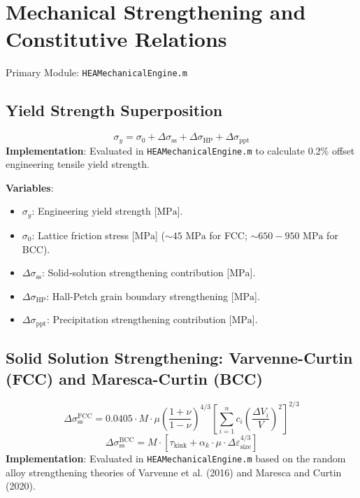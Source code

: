 \documentclass[11pt,a4paper]{article}
\begin{document}
\section{Mechanical Strengthening and Constitutive Relations}
Primary Module: \texttt{HEAMechanicalEngine.m}

\subsection{Yield Strength Superposition}
\begin{equation}
\sigma_y = \sigma_0 + \Delta\sigma_{\text{ss}} + \Delta\sigma_{\text{HP}} + \Delta\sigma_{\text{ppt}}
\end{equation}
\textbf{Implementation}: Evaluated in \texttt{HEAMechanicalEngine.m} to calculate 0.2\% offset engineering tensile yield strength.

\noindent\textbf{Variables}:
\begin{itemize}
  \item $\sigma_y$: Engineering yield strength [$\text{MPa}$].
  \item $\sigma_0$: Lattice friction stress [$\text{MPa}$] ($\sim 45\text{ MPa}$ for FCC; $\sim 650 - 950\text{ MPa}$ for BCC).
  \item $\Delta\sigma_{\text{ss}}$: Solid-solution strengthening contribution [$\text{MPa}$].
  \item $\Delta\sigma_{\text{HP}}$: Hall-Petch grain boundary strengthening [$\text{MPa}$].
  \item $\Delta\sigma_{\text{ppt}}$: Precipitation strengthening contribution [$\text{MPa}$].
\end{itemize}

\subsection{Solid Solution Strengthening: Varvenne-Curtin (FCC) and Maresca-Curtin (BCC)}
\begin{equation}
\Delta\sigma_{\text{ss}}^{\text{FCC}} = 0.0405 \cdot M \cdot \mu \left(\frac{1 + \nu}{1 - \nu}\right)^{4/3} \left[ \sum_{i=1}^n c_i \left(\frac{\Delta V_i}{V}\right)^2 \right]^{2/3}
\end{equation}
\begin{equation}
\Delta\sigma_{\text{ss}}^{\text{BCC}} = M \cdot \left[ \tau_{\text{kink}} + \alpha_k \cdot \mu \cdot \Delta\varepsilon_{\text{size}}^{4/3} \right]
\end{equation}
\textbf{Implementation}: Evaluated in \texttt{HEAMechanicalEngine.m} based on the random alloy strengthening theories of Varvenne et al. (2016) and Maresca and Curtin (2020).
\end{document}
